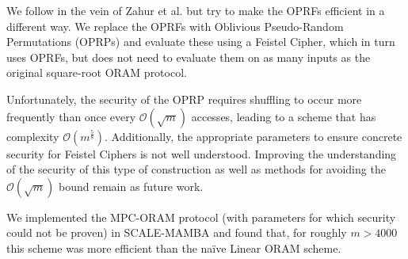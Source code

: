 We follow in the vein of Zahur et al. but try to make the OPRFs 
efficient in a different way.
We replace the OPRFs with Oblivious Pseudo-Random Permutations (OPRPs)
and evaluate these using a Feistel Cipher, which in turn
uses OPRFs, but does not need to evaluate them on as many 
inputs as the original square-root ORAM protocol.

Unfortunately, the security of the OPRP requires shuffling to occur
more frequently than once every $\mathcal{O}(\sqrt{m})$ accesses,
leading to a scheme that has complexity $\mathcal{O}(m^{\frac{5}{8}})$.
Additionally, the appropriate parameters to ensure concrete security
for Feistel Ciphers is not well understood.
Improving the understanding of the security of this type of construction
as well as methods for avoiding the $\mathcal{O}(\sqrt{m})$ bound
remain as future work.

We implemented the MPC-ORAM protocol 
(with parameters for which security could not be proven)
in SCALE-MAMBA and found that, for roughly $m > 4000$ this 
scheme was more efficient than the na\"{i}ve Linear ORAM scheme.
